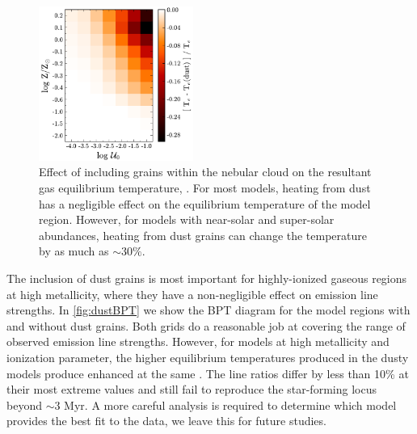 \begin{figure}[!htbp]
  \begin{centering}
    \includegraphics[width=0.45\textwidth]{manuscript/chapter2/f30.pdf}
    \caption{Effect of including grains within the nebular cloud on the resultant gas equilibrium temperature, \Te{}. For most models, heating from dust has a negligible effect on the equilibrium temperature of the model \hii region. However, for models with near-solar and super-solar abundances, heating from dust grains can change the temperature by as much as ${\sim}30\%$.}
    \label{fig:dustHeat}
  \end{centering}
\end{figure}

The inclusion of dust grains is most important for highly-ionized gaseous regions at high metallicity, where they have a non-negligible effect on emission line strengths. In \ref{fig:dustBPT} we show the BPT diagram for the model \hii regions with and without dust grains. Both grids do a reasonable job at covering the range of observed emission line strengths. However, for models at high metallicity and ionization parameter, the higher equilibrium temperatures produced in the dusty models produce enhanced \oiiihb{} at the same \niiha{}. The line ratios differ by less than 10\% at their most extreme values and still fail to reproduce the star-forming locus beyond $\sim 3$ Myr. A more careful analysis is required to determine which model provides the best fit to the data, we leave this for future studies.

